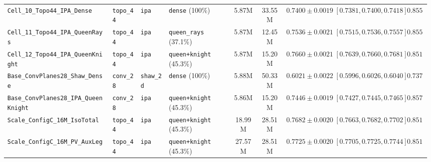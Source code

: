 \documentclass[10pt]{article}
\begin{document}
\begin{table}[h!]
\begin{tabular}{llllccccc}
\texttt{Cell\_10\_Topo44\_IPA\_Dense} & \texttt{topo\_44} & \texttt{ipa} & \texttt{dense} (100\%) & 5.87M & 33.55M & $0.7400 \pm 0.0019$ & $[0.7381, 0.7400, 0.7418]$ & $0.8556$ \\
\texttt{Cell\_11\_Topo44\_IPA\_QueenRays} & \texttt{topo\_44} & \texttt{ipa} & \texttt{queen\_rays} (37.1\%) & 5.87M & 12.45M & $0.7536 \pm 0.0021$ & $[0.7515, 0.7536, 0.7557]$ & $0.8556$ \\
\texttt{Cell\_12\_Topo44\_IPA\_QueenKnight} & \texttt{topo\_44} & \texttt{ipa} & \texttt{queen+knight} (45.3\%) & 5.87M & 15.20M & $\mathbf{0.7660 \pm 0.0021}$ & $[0.7639, 0.7660, 0.7681]$ & $0.8512$ \\
\midrule
\texttt{Base\_ConvPlanes28\_Shaw\_Dense} & \texttt{conv\_28} & \texttt{shaw\_2d} & \texttt{dense} (100\%) & 5.88M & 50.33M & $0.6021 \pm 0.0022$ & $[0.5996, 0.6026, 0.6040]$ & $0.7374$ \\
\texttt{Base\_ConvPlanes28\_IPA\_QueenKnight} & \texttt{conv\_28} & \texttt{ipa} & \texttt{queen+knight} (45.3\%) & 5.86M & 15.20M & $0.7446 \pm 0.0019$ & $[0.7427, 0.7445, 0.7465]$ & $0.8571$ \\
\texttt{Scale\_ConfigC\_16M\_IsoTotal} & \texttt{topo\_44} & \texttt{ipa} & \texttt{queen+knight} (45.3\%) & 18.99M & 28.51M & $0.7682 \pm 0.0020$ & $[0.7663, 0.7682, 0.7702]$ & $0.8516$ \\
\texttt{Scale\_ConfigC\_16M\_PV\_AuxLeg} & \texttt{topo\_44} & \texttt{ipa} & \texttt{queen+knight} (45.3\%) & 27.57M & 28.51M & $\mathbf{0.7725 \pm 0.0020}$ & $[0.7705, 0.7725, 0.7744]$ & $0.8516$ \\
\bottomrule
\end{tabular}
\end{table}
\end{document}
